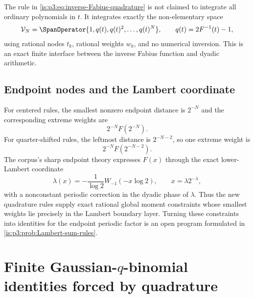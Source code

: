 \begin{remark}
The rule in \eqref{is:p3:eq:inverse-Fabius-quadrature} is not claimed to integrate all ordinary polynomials in $t$.  It integrates exactly the non-elementary space
\begin{equation}
 \mathcal V_N
 =\SpanOperator\{1,q(t),q(t)^2,\ldots,q(t)^N\},
 \qquad q(t)=2F^{-1}(t)-1,
 \label{is:p3:eq:inverse-exactness-space}
\end{equation}
using rational nodes $t_k$, rational weights $w_k$, and no numerical inversion.  This is an exact finite interface between the inverse Fabius function and dyadic arithmetic.
\end{remark}

\subsection{Endpoint nodes and the Lambert coordinate}

For centered rules, the smallest nonzero endpoint distance is $2^{-N}$ and the corresponding extreme weights are
\begin{equation}
 2^{-N}F(2^{-N}).
 \label{is:p3:eq:centered-extreme-weight}
\end{equation}
For quarter-shifted rules, the leftmost distance is $2^{-N-2}$, so one extreme weight is
\begin{equation}
 2^{-N}F(2^{-N-2}).
 \label{is:p3:eq:quarter-extreme-weight}
\end{equation}
The corpus's sharp endpoint theory expresses $F(x)$ through the exact lower-Lambert coordinate
\begin{equation}
 \lambda(x)=-\frac1{\log2}W_{-1}(-x\log2),
 \qquad x=\lambda2^{-\lambda},
 \label{is:p3:eq:Lambert-coordinate}
\end{equation}
with a nonconstant periodic correction in the dyadic phase of $\lambda$.  Thus the new quadrature rules supply exact rational global moment constraints whose smallest weights lie precisely in the Lambert boundary layer.  Turning these constraints into identities for the endpoint periodic factor is an open program formulated in \cref{is:p3:prob:Lambert-sum-rules}.

\section{Finite Gaussian-\texorpdfstring{$q$}{q}-binomial identities forced by quadrature}
\label{is:p3:sec:qbinomial}

